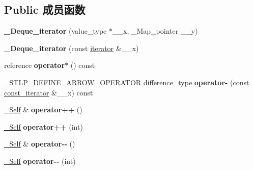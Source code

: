 \subsection*{Public 成员函数}
\begin{DoxyCompactItemize}
\item 
\mbox{\label{struct___deque__iterator_a99724bc120358b820a9561fb94e8379f}} 
{\bfseries \+\_\+\+Deque\+\_\+iterator} (value\+\_\+type $\ast$\+\_\+\+\_\+x, \+\_\+\+Map\+\_\+pointer \+\_\+\+\_\+y)
\item 
\mbox{\label{struct___deque__iterator_a01779246c56e19c861279c3fac0cf0bf}} 
{\bfseries \+\_\+\+Deque\+\_\+iterator} (const \hyperlink{struct___deque__iterator}{iterator} \&\+\_\+\+\_\+x)
\item 
\mbox{\label{struct___deque__iterator_ab5d87fdc3ca73ad3c5a4f72b7ce290cb}} 
reference {\bfseries operator$\ast$} () const
\item 
\mbox{\label{struct___deque__iterator_a497306b958c43acad645d06d1d84addf}} 
\+\_\+\+S\+T\+L\+P\+\_\+\+D\+E\+F\+I\+N\+E\+\_\+\+A\+R\+R\+O\+W\+\_\+\+O\+P\+E\+R\+A\+T\+OR difference\+\_\+type {\bfseries operator-\/} (const \hyperlink{struct___deque__iterator}{const\+\_\+iterator} \&\+\_\+\+\_\+x) const
\item 
\mbox{\label{struct___deque__iterator_a63293f20e627f1e7e609fdc8b757f44a}} 
\hyperlink{struct___deque__iterator__base}{\+\_\+\+Self} \& {\bfseries operator++} ()
\item 
\mbox{\label{struct___deque__iterator_a99aedd01cadc4b67f558aeecacefc0d8}} 
\hyperlink{struct___deque__iterator__base}{\+\_\+\+Self} {\bfseries operator++} (int)
\item 
\mbox{\label{struct___deque__iterator_a5b7d3287bd936c953fedda5c0d2f6f64}} 
\hyperlink{struct___deque__iterator__base}{\+\_\+\+Self} \& {\bfseries operator-\/-\/} ()
\item 
\mbox{\label{struct___deque__iterator_ad370015a352fa18be5c773b7fa55bad2}} 
\hyperlink{struct___deque__iterator__base}{\+\_\+\+Self} {\bfseries operator-\/-\/} (int)

\end{DoxyCompactItemize}
